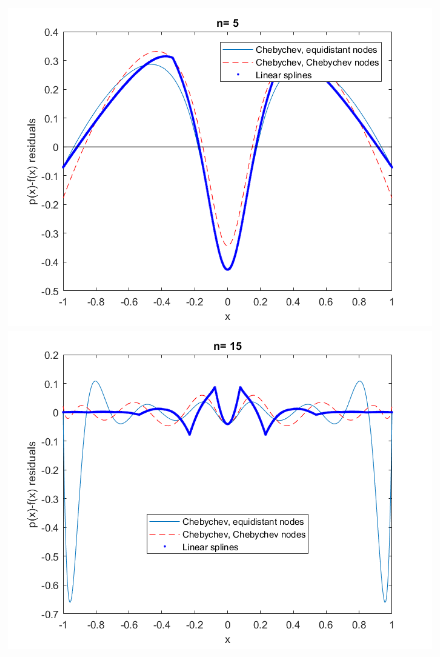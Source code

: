 \documentclass{article}
\begin{document}
	\begin{figure}[h]
	  \begin{minipage}{0.56\textwidth}
	  	\includegraphics[width = \textwidth, keepaspectratio]{n5res.png}
	  \end{minipage}
	  \begin{minipage}{0.56\textwidth}
	    \includegraphics[width = \textwidth, keepaspectratio]{n15res.png}
      \end{minipage}
   	  \begin{minipage}{0.56\textwidth}

\end{minipage}
\end{figure}
\end{document}
